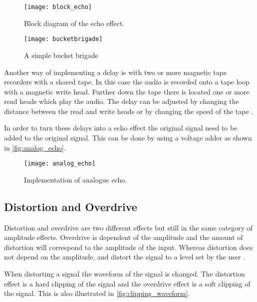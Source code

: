 \begin{figure}[htbp]
    \centering
    \texttt{[image: block\_echo]}
    \caption{Block diagram of the echo effect.}
    \label{fig:echo_block_anal}
\end{figure}

\begin{figure}[H]
    \centering
    \texttt{[image: bucketbrigade]}
    \caption{A simple bucket brigade \citep{se_bucket_brigade}}{
    \label{fig:bucketbrigade}
    }
\end{figure}


Another way of implementing a delay is with two or more magnetic tape recorders with a shared tape. In this case the audio is recorded onto a tape loop with a magnetic write head. Further down the tape there is located one or more read heads which play the audio. The delay can be adjusted by changing the distance between the read and write heads or by changing the speed of the tape \citep{mag_tape_delay_hist}.

In order to turn these delays into a echo effect the original signal need to be added to the original signal. This can be done by using a voltage adder as shown in \autoref{fig:analog_echo}.

\begin{figure}[htbp]
    \centering
    \texttt{[image: analog\_echo]}
    \caption{Implementation of analogue echo.}
    \label{fig:analog_echo}
\end{figure}








\subsection{Distortion and Overdrive}\label{subs:dist_overdrive}
Distortion and overdrive are two different effects but still in the same category of amplitude effects. Overdrive is dependent of the amplitude and the amount of distortion will correspond to the amplitude of the input. Whereas distortion does not depend on the amplitude, and distort the signal to a level set by the user \citep{guitar_science2014}.

When distorting a signal the waveform of the signal is changed. The distortion effect is a hard clipping of the signal and the overdrive effect is a soft clipping of the signal. This is also illustrated in \autoref{fig:clipping_waveform}.

